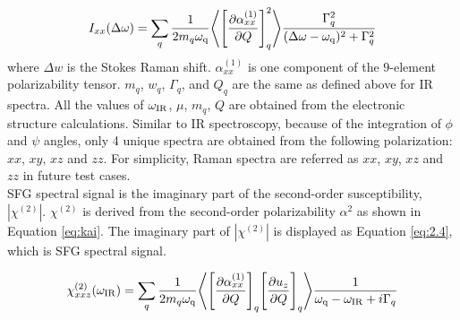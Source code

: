 \begin{equation} \label{eq:2.3}
I_{xx}(\Delta \omega) = \sum_{q} \frac{1}{2 m_{q} \omega_{\rm q}} \Bigg \langle \Bigg\lbrack \frac{\partial \alpha_{xx}^{(1)}}{\partial Q} \Bigg\rbrack_{q} ^2 \Bigg\rangle \frac{\Gamma_q^2}{(\Delta \omega-\omega_{\rm q})^2 + \Gamma_q^2}
\end{equation} 
where $\Delta w$ is the Stokes Raman shift. $\alpha_{xx}^{(1)}$ is one component of the $9$-element polarizability tensor. $m_q$, $w_q$, $\Gamma_q$, and $Q_q$ are the same as defined above for IR spectra. All the values of $\omega_{\rm IR}$, $\mu$, $m_q$, $Q$ are obtained from the electronic structure calculations. Similar to IR spectroscopy, because of the integration of $\phi$ and $\psi$ angles, only 4 unique spectra are obtained from the following polarization: $xx$, $xy$, $xz$ and $zz$. For simplicity, Raman spectra are referred as $xx$, $xy$, $xz$ and $zz$ in future test cases. \\

SFG spectral signal is the imaginary part of the second-order susceptibility, $\left|\chi^{(2)}\right|$. $\chi^{(2)}$ is derived from the second-order polarizability $\alpha^{2}$ as shown in Equation \ref{eq:kai}. The imaginary part of $\left|\chi^{(2)}\right|$ is displayed as Equation \ref{eq:2.4}, which is SFG spectral signal.

\begin{equation} \label{eq:kai}
\chi^{(2)}_{xxz} (\omega_{\rm IR}) = \sum_{q} \frac{1}{2 m_{q} \omega_{\rm q}} \Bigg \langle \Bigg\lbrack \frac{\partial \alpha_{xx}^{(1)}}{\partial Q} \Bigg\rbrack_{q} \Bigg\lbrack \frac{\partial u_{z}}{\partial Q} \Bigg\rbrack_{q} \Bigg\rangle \frac{1}{\omega_{\rm q}-\omega_{\rm IR}+i\Gamma_q}
\end{equation} 


